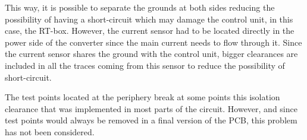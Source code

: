 This way, it is possible to separate the grounds at both sides reducing the possibility of having a short-circuit which may damage the control unit, in this case, the RT-box. However, the current sensor had to be located directly in the power side of the converter since the main current needs to flow through it. Since the current sensor shares the ground with the control unit, bigger clearances are included in all the traces coming from this sensor to reduce the possibility of short-circuit. 

The test points located at the periphery break at some points this isolation clearance that was implemented in most parts of the circuit. However, and since test points would always be removed in a final version of the PCB, this problem has not been considered.
